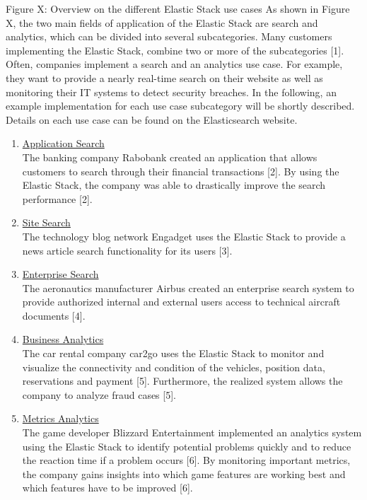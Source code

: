 Figure X: Overview on the different Elastic Stack use cases
As shown in Figure X, the two main fields of application of the Elastic Stack are search and analytics, which can be divided into several subcategories. Many customers implementing the Elastic Stack, combine two or more of the subcategories [1]. Often, companies implement a search and an analytics use case. For example, they want to provide a nearly real-time search on their website as well as monitoring their IT systems to detect security breaches. 
In the following, an example implementation for each use case subcategory will be shortly described. Details on each use case can be found on the Elasticsearch website.
\begin{enumerate}
    
    \item \underline{Application Search} \\
    The banking company Rabobank created an application that allows customers to search through their financial transactions [2]. By using the Elastic Stack, the company was able to drastically improve the search performance [2].
    
    \item \underline{Site Search} \\
    The technology blog network Engadget uses the Elastic Stack to provide a news article search functionality for its users [3]. 

    \item \underline{Enterprise Search} \\
    The aeronautics manufacturer Airbus created an enterprise search system to provide authorized internal and external users access to technical aircraft documents [4]. 

    \item \underline{Business Analytics} \\
    The car rental company car2go uses the Elastic Stack to monitor and visualize the connectivity and condition of the vehicles, position data, reservations and payment [5]. Furthermore, the realized system allows the company to analyze fraud cases [5].

    \item \underline{Metrics Analytics} \\
    The game developer Blizzard Entertainment implemented an analytics system using the Elastic Stack to identify potential problems quickly and to reduce the reaction time if a problem occurs [6]. By monitoring important metrics, the company gains insights into which game features are working best and which features have to be improved [6].


\end{enumerate}
